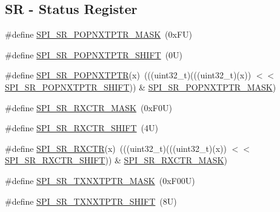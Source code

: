 \subsection*{SR -\/ Status Register}
\begin{DoxyCompactItemize}
\item 
\#define \mbox{\hyperlink{group___s_p_i___register___masks_gabf0bcd5a32bcc6e58bac1a0f826ab3c6}{S\+P\+I\+\_\+\+S\+R\+\_\+\+P\+O\+P\+N\+X\+T\+P\+T\+R\+\_\+\+M\+A\+SK}}~(0x\+F\+U)
\item 
\#define \mbox{\hyperlink{group___s_p_i___register___masks_gac1f2a81bf6d8b44020db098097c74964}{S\+P\+I\+\_\+\+S\+R\+\_\+\+P\+O\+P\+N\+X\+T\+P\+T\+R\+\_\+\+S\+H\+I\+FT}}~(0\+U)
\item 
\#define \mbox{\hyperlink{group___s_p_i___register___masks_ga7524dc6520cf5bcea82f6d62db3a5ee8}{S\+P\+I\+\_\+\+S\+R\+\_\+\+P\+O\+P\+N\+X\+T\+P\+TR}}(x)~(((uint32\+\_\+t)(((uint32\+\_\+t)(x)) $<$$<$ \mbox{\hyperlink{group___s_p_i___register___masks_gac1f2a81bf6d8b44020db098097c74964}{S\+P\+I\+\_\+\+S\+R\+\_\+\+P\+O\+P\+N\+X\+T\+P\+T\+R\+\_\+\+S\+H\+I\+FT}})) \& \mbox{\hyperlink{group___s_p_i___register___masks_gabf0bcd5a32bcc6e58bac1a0f826ab3c6}{S\+P\+I\+\_\+\+S\+R\+\_\+\+P\+O\+P\+N\+X\+T\+P\+T\+R\+\_\+\+M\+A\+SK}})
\item 
\#define \mbox{\hyperlink{group___s_p_i___register___masks_gad70ca8db9ba4e1d62e081ef648d84752}{S\+P\+I\+\_\+\+S\+R\+\_\+\+R\+X\+C\+T\+R\+\_\+\+M\+A\+SK}}~(0x\+F0\+U)
\item 
\#define \mbox{\hyperlink{group___s_p_i___register___masks_gacd499785f654eb1b4d1ced2bf0b2e7ac}{S\+P\+I\+\_\+\+S\+R\+\_\+\+R\+X\+C\+T\+R\+\_\+\+S\+H\+I\+FT}}~(4\+U)
\item 
\#define \mbox{\hyperlink{group___s_p_i___register___masks_ga2b05bb18cd3b859747bf5bff6e0eda29}{S\+P\+I\+\_\+\+S\+R\+\_\+\+R\+X\+C\+TR}}(x)~(((uint32\+\_\+t)(((uint32\+\_\+t)(x)) $<$$<$ \mbox{\hyperlink{group___s_p_i___register___masks_gacd499785f654eb1b4d1ced2bf0b2e7ac}{S\+P\+I\+\_\+\+S\+R\+\_\+\+R\+X\+C\+T\+R\+\_\+\+S\+H\+I\+FT}})) \& \mbox{\hyperlink{group___s_p_i___register___masks_gad70ca8db9ba4e1d62e081ef648d84752}{S\+P\+I\+\_\+\+S\+R\+\_\+\+R\+X\+C\+T\+R\+\_\+\+M\+A\+SK}})
\item 
\#define \mbox{\hyperlink{group___s_p_i___register___masks_ga5526eeae29bb85218c41d8a06608acbd}{S\+P\+I\+\_\+\+S\+R\+\_\+\+T\+X\+N\+X\+T\+P\+T\+R\+\_\+\+M\+A\+SK}}~(0x\+F00\+U)
\item 
\#define \mbox{\hyperlink{group___s_p_i___register___masks_ga129ad514464ae667c6d78ee9840236d5}{S\+P\+I\+\_\+\+S\+R\+\_\+\+T\+X\+N\+X\+T\+P\+T\+R\+\_\+\+S\+H\+I\+FT}}~(8\+U)

\end{DoxyCompactItemize}
